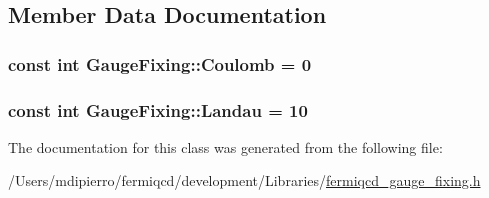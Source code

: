 \subsection{Member Data Documentation}
\hypertarget{class_gauge_fixing_a8be5d99ab21951db104df17ffdd7362f}{
\subsubsection[{Coulomb}]{\setlength{\rightskip}{0pt plus 5cm}const int {\bf GaugeFixing::Coulomb} = 0}}
\label{class_gauge_fixing_a8be5d99ab21951db104df17ffdd7362f}
\hypertarget{class_gauge_fixing_a115e0b47731237fd9ff984c7f6881994}{
\subsubsection[{Landau}]{\setlength{\rightskip}{0pt plus 5cm}const int {\bf GaugeFixing::Landau} = 10}}
\label{class_gauge_fixing_a115e0b47731237fd9ff984c7f6881994}


The documentation for this class was generated from the following file:\begin{DoxyCompactItemize}
\item 
/Users/mdipierro/fermiqcd/development/Libraries/\hyperlink{fermiqcd__gauge__fixing_8h}{fermiqcd\_\-gauge\_\-fixing.h}\end{DoxyCompactItemize}
